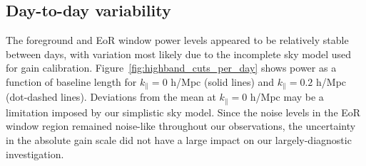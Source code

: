 \documentclass[twocolumn, trackchanges]{aastex61}
\begin{document}
\subsection{Day-to-day variability}

The foreground and EoR window power levels appeared to be relatively stable between days, with variation most likely due to the incomplete sky model used for gain calibration. Figure~\ref{fig:highband_cuts_per_day} shows power as a function of baseline length for $k_{\parallel}=0$ h/Mpc (solid lines) and $k_{\parallel}=0.2$ h/Mpc (dot-dashed lines). Deviations from the mean at $k_{\parallel}=0$ h/Mpc may be a limitation imposed by our simplistic sky model. Since the noise levels in the EoR window region remained noise-like throughout our observations, the uncertainty in the absolute gain scale did not have a large impact on our largely-diagnostic investigation.
\end{document}
